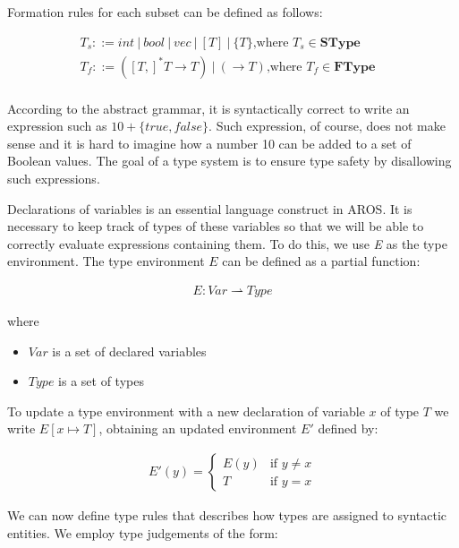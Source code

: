 Formation rules for each subset can be defined as follows:

\begin{align*}
    & T_s ::= int \: | \: bool \: | \: vec \: | \: [T] \: | \: \{T\} \text{,where } T_s \in \mathbf{SType} \\
    & T_f ::= ([T,]^*T \rightarrow T) \: | \: (\rightarrow T) \text{,where } T_f \in \mathbf {FType} \\
    &&&
\end{align*}

\newblock
\par
According to the abstract grammar, it is syntactically correct to write an expression such as $10+\{true, false\} $. Such expression, of course, does not make sense and it is hard to imagine how a number 10 can be added to a set of Boolean values. The goal of a type system is to ensure type safety by disallowing such expressions.

\par
Declarations of variables is an essential language construct in AROS. It is necessary to keep track of types of these variables so that we will be able to correctly evaluate expressions containing them. To do this, we use \textit{E} as the type environment. The type environment $E$ can be defined as a partial function: 

\begin{align*}
    E: Var \rightharpoonup Type
\end{align*}

where
\begin{itemize}
    \item $Var$ is a set of declared variables
    \item $Type$ is a set of types
    \newline
\end{itemize}

\par
To update a type environment with a new declaration of variable $x$ of type $T$ we write $E[x \longmapsto T]$, obtaining an updated environment $E'$ defined by: 

\begin{align*}
    E'(y) = \begin{cases} E(y) &\mbox{if } y \neq x \\ 
   T &\mbox{if } y = x \end{cases}
\end{align*}

We can now define type rules that describes how types are assigned to syntactic entities. We employ type judgements of the form:     

